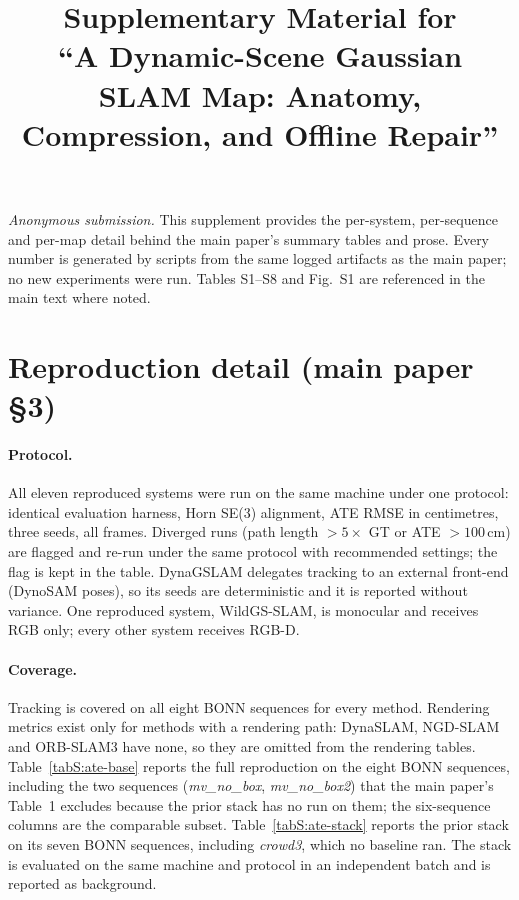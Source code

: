 \documentclass[11pt]{article}
\title{Supplementary Material for\\[2pt]
``A Dynamic-Scene Gaussian SLAM Map: Anatomy, Compression, and Offline Repair''}
\author{}
\date{}
\begin{document}
\maketitle
\vspace{-2em}
\noindent\emph{Anonymous submission.} This supplement provides the per-system,
per-sequence and per-map detail behind the main paper's summary tables and prose.
Every number is generated by scripts from the same logged artifacts as the main
paper; no new experiments were run. Tables S1--S8 and Fig.~S1 are referenced
in the main text where noted.

\section{Reproduction detail (main paper \S3)}
\paragraph{Protocol.} All eleven reproduced systems were run on the same machine
under one protocol: identical evaluation harness, Horn SE(3) alignment, ATE RMSE in
centimetres, three seeds, all frames. Diverged runs (path length $>5\times$ GT or ATE
$>100$\,cm) are flagged and re-run under the same protocol with recommended
settings; the flag is kept in the table. DynaGSLAM delegates tracking to an external
front-end (DynoSAM poses), so its seeds are deterministic and it is reported without
variance. One reproduced system, WildGS-SLAM, is monocular and receives RGB
only; every other system receives RGB-D.
\paragraph{Coverage.} Tracking is covered on all eight BONN sequences for every
method. Rendering metrics exist only for methods with a rendering path: DynaSLAM,
NGD-SLAM and ORB-SLAM3 have none, so they are omitted from the rendering tables.
Table~\ref{tabS:ate-base} reports the full reproduction on the
eight BONN sequences, including the two sequences (\emph{mv\_no\_box},
\emph{mv\_no\_box2}) that the main paper's Table~1 excludes because the prior stack
has no run on them; the six-sequence columns are the comparable subset.
Table~\ref{tabS:ate-stack} reports the prior stack on its seven BONN sequences,
including \emph{crowd3}, which no baseline ran. The stack is evaluated on the same
machine and protocol in an independent batch and is reported as background.




\end{document}
